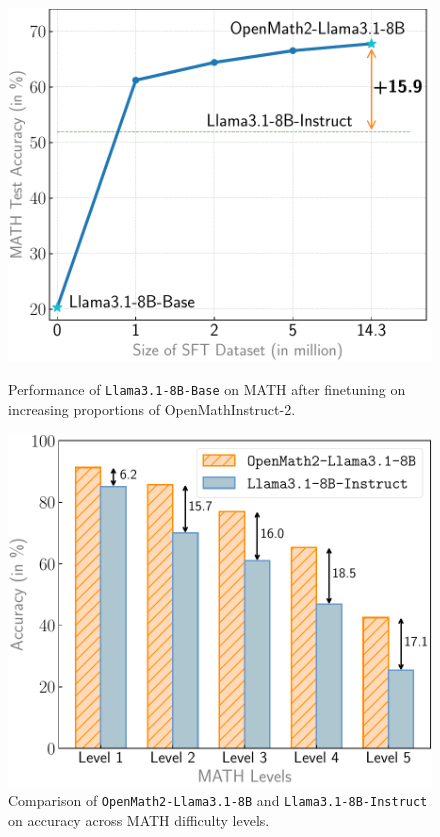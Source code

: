 \begin{figure}[t]
    \centering
    \begin{minipage}[t]{0.48\linewidth}
        \centering
        \includegraphics[width=\linewidth]{plots/scaling_plot.pdf}
        \caption{Performance of \texttt{Llama3.1-8B-Base} on MATH after finetuning on increasing proportions of OpenMathInstruct-2.}
        \label{fig:sft_scale}
    \end{minipage}
    \hfill
    \begin{minipage}[t]{0.48\linewidth}
        \centering
        \includegraphics[width=\linewidth]{plots/math_level_comp.pdf}
        \caption{Comparison of \texttt{OpenMath2-Llama3.1-8B}  and \texttt{Llama3.1-8B-Instruct} on accuracy across MATH difficulty levels.}
        \label{fig:math_level_comp}
    \end{minipage}
\end{figure}



